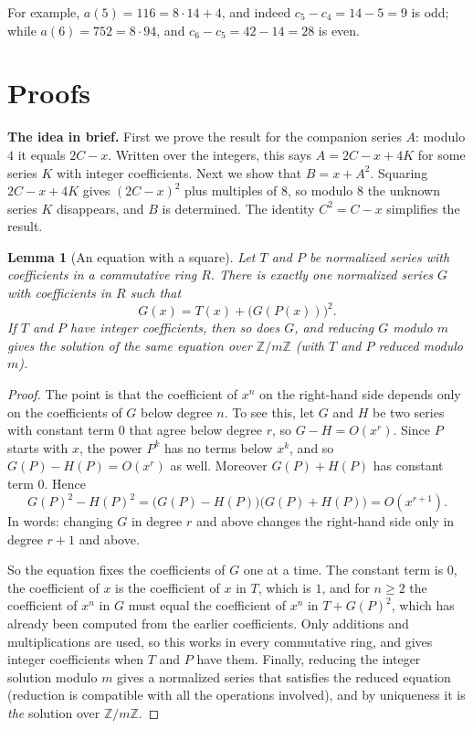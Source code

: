 \documentclass[11pt,a4paper]{article}
\newtheorem{lemma}[theorem]{Lemma}
\theoremstyle{definition}
\theoremstyle{remark}
\newcommand{\Z}{\mathbb{Z}}
\newcommand{\para}[1]{\par\medskip\noindent\textbf{#1}\enspace}
\begin{document}
For example, $a(5)=116=8\cdot14+4$, and indeed $c_5-c_4=14-5=9$ is odd; while $a(6)=752=8\cdot94$, and
$c_6-c_5=42-14=28$ is even.

\section{Proofs}\label{sec:proofs}

\para{The idea in brief.} First we prove the result for the companion series $A$: modulo $4$ it equals $2C-x$.
Written over the integers, this says $A=2C-x+4K$ for some series $K$ with integer coefficients. Next we show that
$B=x+A^2$. Squaring $2C-x+4K$ gives $(2C-x)^2$ plus multiples of $8$, so modulo $8$ the unknown series $K$ disappears,
and $B$ is determined. The identity $C^2=C-x$ simplifies the result.

\begin{lemma}[An equation with a square]\label{lem:square}
Let $T$ and $P$ be normalized series with coefficients in a commutative ring $R$. There is exactly one normalized
series $G$ with coefficients in $R$ such that
\[
G(x)=T(x)+\bigl(G(P(x))\bigr)^2 .
\]
If $T$ and $P$ have integer coefficients, then so does $G$, and reducing $G$ modulo $m$ gives the solution of the same
equation over $\Z/m\Z$ (with $T$ and $P$ reduced modulo $m$).
\end{lemma}

\begin{proof}
The point is that the coefficient of $x^n$ on the right-hand side depends only on the coefficients of $G$ below degree
$n$. To see this, let $G$ and $H$ be two series with constant term $0$ that agree below degree $r$, so $G-H=O(x^r)$.
Since $P$ starts with $x$, the power $P^k$ has no terms below $x^k$, and so $G(P)-H(P)=O(x^r)$ as well. Moreover
$G(P)+H(P)$ has constant term $0$. Hence
\[
G(P)^2-H(P)^2=\bigl(G(P)-H(P)\bigr)\bigl(G(P)+H(P)\bigr)=O(x^{r+1}).
\]
In words: changing $G$ in degree $r$ and above changes the right-hand side only in degree $r+1$ and above.

So the equation fixes the coefficients of $G$ one at a time. The constant term is $0$, the coefficient of $x$ is the
coefficient of $x$ in $T$, which is $1$, and for $n\ge2$ the coefficient of $x^n$ in $G$ must equal the coefficient of
$x^n$ in $T+G(P)^2$, which has already been computed from the earlier coefficients. Only additions and multiplications
are used, so this works in every commutative ring, and gives integer coefficients when $T$ and $P$ have them. Finally,
reducing the integer solution modulo $m$ gives a normalized series that satisfies the reduced equation (reduction is
compatible with all the operations involved), and by uniqueness it is \emph{the} solution over $\Z/m\Z$.
\end{proof}
\end{document}
